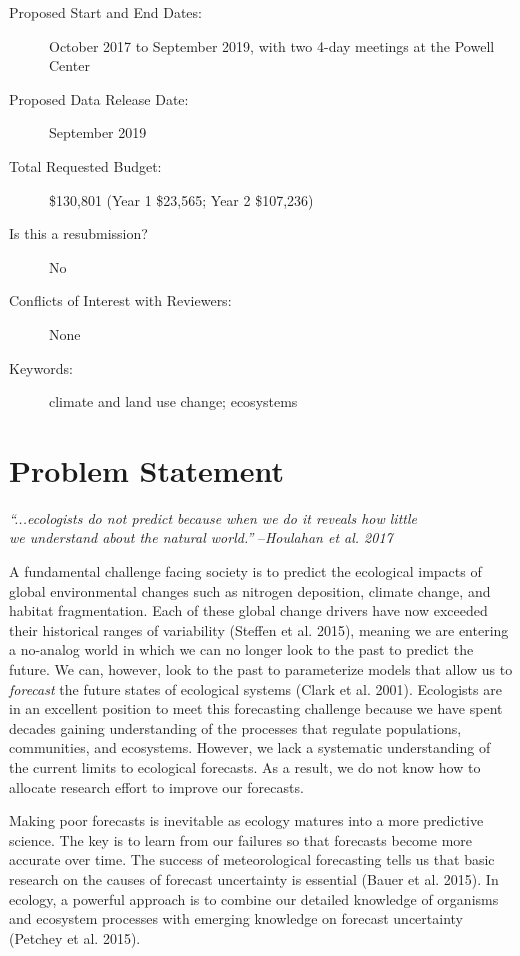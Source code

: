 \documentclass[12pt,]{article}
\begin{document}
\begin{description}
\item[Proposed Start and End Dates:] October 2017 to September 2019, with two 4-day meetings at the Powell Center
\item[Proposed Data Release Date:] September 2019
\item[Total Requested Budget:] \$130,801 (Year 1 \$23,565; Year 2 \$107,236)
\item[Is this a resubmission?] No
\item[Conflicts of Interest with Reviewers:] None
\item[Keywords:] climate and land use change; ecosystems
\end{description}

\newpage{}


\section{Problem Statement}\vspace{-1em}

\small{}
\phantom{}\hspace{8em}\textit{``...ecologists do not predict because when we do it reveals how little\\\phantom{}\hspace{8em}we understand about the natural world.''}
--\textit{Houlahan et al. 2017}

\normalsize{} \vspace{0.5em} A fundamental challenge facing society is
to predict the ecological impacts of global environmental changes such
as nitrogen deposition, climate change, and habitat fragmentation. Each
of these global change drivers have now exceeded their historical ranges
of variability (Steffen et al. 2015), meaning we are entering a
no-analog world in which we can no longer look to the past to predict
the future. We can, however, look to the past to parameterize models
that allow us to \emph{forecast} the future states of ecological systems
(Clark et al. 2001). Ecologists are in an excellent position to meet
this forecasting challenge because we have spent decades gaining
understanding of the processes that regulate populations, communities,
and ecosystems. However, we lack a systematic understanding of the
current limits to ecological forecasts. As a result, we do not know how
to allocate research effort to improve our forecasts.

Making poor forecasts is inevitable as ecology matures into a more
predictive science. The key is to learn from our failures so that
forecasts become more accurate over time. The success of meteorological
forecasting tells us that basic research on the causes of forecast
uncertainty is essential (Bauer et al. 2015). In ecology, a powerful
approach is to combine our detailed knowledge of organisms and ecosystem
processes with emerging knowledge on forecast uncertainty (Petchey et
al. 2015).
\end{document}
